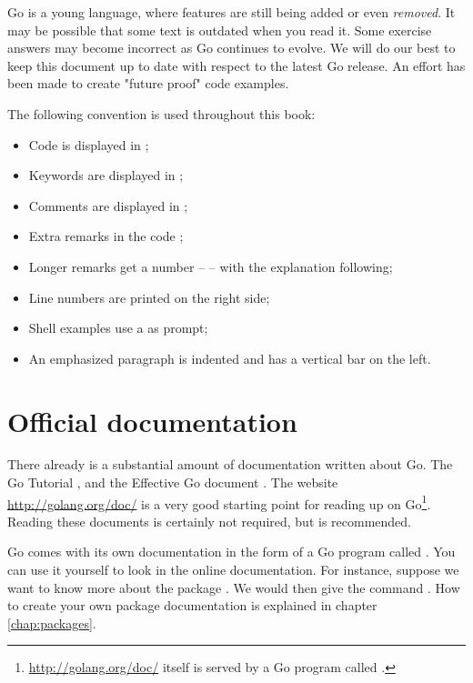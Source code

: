 Go is a young language, where 
features are still being added or even \emph{removed}. It 
may be possible that some text is outdated when you
read it. 
Some exercise answers may become incorrect as Go continues
to evolve.
We will do our best to keep this document up to 
date with respect to the latest Go release.
An effort has been made to create "future proof" code examples.

The following convention is used throughout this book:
\begin{itemize}
\item Code is displayed in ;
\item Keywords are displayed in ;
\item Comments are displayed in ;
\item Extra remarks in the code ;
\item Longer remarks get a number --  -- with the explanation following;
\item Line numbers are printed on the right side;
\item Shell examples use a \pr{} as prompt;
\item An emphasized paragraph is indented and has a vertical bar on the
left.
\end{itemize}

\section{Official documentation}
There already is a substantial amount of documentation written about Go.
The Go Tutorial \cite{go_tutorial}, and the Effective Go
document \cite{effective_go}. The
website \url{http://golang.org/doc/} is a very good starting point
for reading up on Go\footnote{\url{http://golang.org/doc/} itself is served by 
a Go program called .}. Reading these documents is
certainly not required, but is recommended.

Go comes with its own documentation in the form of a Go program called
. 
You can use it yourself to look
in the online documentation. For
instance, suppose we want to know more about the package .
We would then give the command .
How to create your own package documentation
is explained in chapter \ref{chap:packages}.

